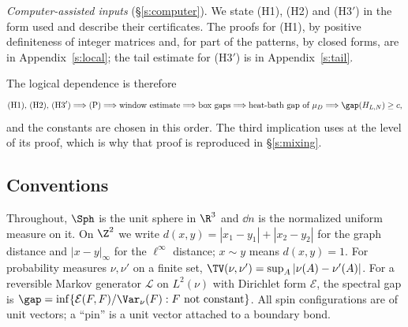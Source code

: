 \emph{Computer-assisted inputs} (\S\ref{s:computer}). We state (H1), (H2) and (H3$'$) in the form used and describe their certificates. The proofs for (H1), by positive definiteness of integer matrices and, for part of the patterns, by closed forms, are in Appendix~\ref{s:local}; the tail estimate for (H3$'$) is in Appendix~\ref{s:tail}.

The logical dependence is therefore
\begin{equation*}
\text{(H1), (H2), (H3$'$)} \Longrightarrow \text{(P)} \Longrightarrow \text{window estimate} \Longrightarrow \text{box gaps} \Longrightarrow \text{heat-bath gap of } \mu_D \Longrightarrow \gap(H_{L, N}) \ge c ,
\end{equation*}
and the constants are chosen in this order. The third implication uses \cite{MOS94} at the level of its proof, which is why that proof is reproduced in \S\ref{s:mixing}.

\subsection{Conventions}

Throughout, $\Sph$ is the unit sphere in $\R^3$ and $\dd n$ is the normalized uniform measure on it. On $\Z^2$ we write $d(x, y) = |x_1 - y_1| + |x_2 - y_2|$ for the graph distance and $|x - y|_\infty$ for the $\ell^\infty$ distance; $x \sim y$ means $d(x, y) = 1$. For probability measures $\nu, \nu'$ on a finite set, $\TV(\nu, \nu') = \sup_A |\nu(A) - \nu'(A)|$. For a reversible Markov generator $\mathcal L$ on $L^2(\nu)$ with Dirichlet form $\mathcal E$, the spectral gap is $\gap = \inf \{ \mathcal E(F, F) / \Var_\nu(F) : F \text{ not constant} \}$. All spin configurations are of unit vectors; a ``pin'' is a unit vector attached to a boundary bond.

